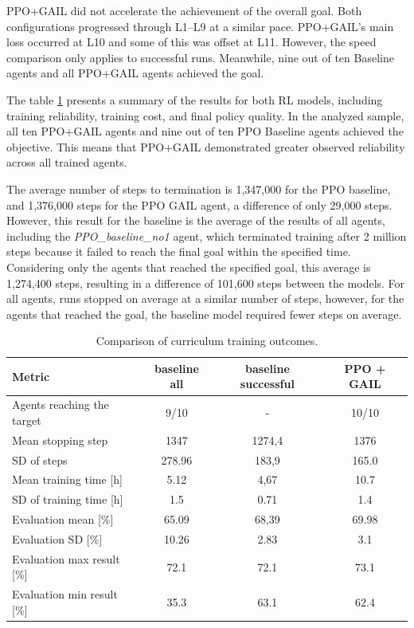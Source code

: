 PPO+GAIL did not accelerate the achievement of the overall goal. Both configurations progressed through L1–L9 at a similar pace. PPO+GAIL’s main loss occurred at L10 and some of this was offset at L11. However, the speed comparison only applies to successful runs. Meanwhile, nine out of ten Baseline agents and all PPO+GAIL agents achieved the goal.

The table \ref{tab:cross_model_training} presents a summary of the results for both RL models, including training reliability, training cost, and final policy quality. In the analyzed sample, all ten PPO+GAIL agents and nine out of ten PPO Baseline agents achieved the objective. This means that PPO+GAIL demonstrated greater observed reliability across all trained agents.

The average number of steps to termination is 1,347,000 for the PPO baseline, and 1,376,000 steps for the PPO GAIL agent, a difference of only 29,000 steps. However, this result for the baseline is the average of the results of all agents, including the \textit{PPO\_baseline\_no1} agent, which terminated training after 2 million steps because it failed to reach the final goal within the specified time. Considering only the agents that reached the specified goal, this average is 1,274,400 steps, resulting in a difference of 101,600 steps between the models. For all agents, runs stopped on average at a similar number of steps, however, for the agents that reached the goal, the baseline model required fewer steps on average.

\begin{table}[H]
	\centering
	\caption{Comparison of curriculum training outcomes.}
	\label{tab:cross_model_training}
	\begin{tabular}{l c c c}
		\toprule
		\textbf{Metric} &
		\textbf{baseline all} &
		\textbf{baseline successful} &
		\textbf{PPO + GAIL} \\
		\midrule
		Agents reaching the target  & 9/10 & - & 10/10 \\
		Mean stopping step          & 1347 & 1274,4 & 1376 \\
		SD of steps                 & 278.96 & 183,9 & 165.0 \\
		Mean training time [h]      & 5.12 & 4,67 &10.7 \\
		SD of training time [h]     & 1.5 & 0.71 &1.4 \\
		Evaluation mean [\%] 			& 65.09 &68,39  & 69.98\\
		Evaluation SD [\%]			& 10.26	& 2.83 &3.1 \\
		Evaluation max result [\%] 		& 72.1	& 72.1 &73.1\\
		Evaluation min result [\%] 		& 35.3	& 63.1	&62.4\\
		\bottomrule
	\end{tabular}
\end{table}


